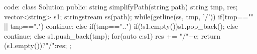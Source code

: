 code:
class Solution {
public:
    string simplifyPath(string path) {
        string tmp, res;
        vector<string> s1;
        stringstream ss(path);
        while(getline(ss, tmp, '/'))
        {
            if(tmp=="" || tmp==".") continue;
            else if(tmp=="..")
            {
                if(!s1.empty())s1.pop_back();
                else continue;
            }
            else s1.push_back(tmp);
        }
        for(auto c:s1) res += "/"+c;
        return (s1.empty())?"/":res;
    }
};